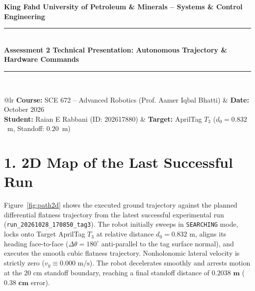 \documentclass[10pt,a4paper]{article}
\begin{document}
\begin{center}
    {\large \textbf{King Fahd University of Petroleum \& Minerals -- Systems \& Control Engineering}}\\[0.02cm]
    \rule{\textwidth}{0.7pt}\\[0.04cm]
    {\Large \textbf{Assessment 2 Technical Presentation: Autonomous Trajectory \& Hardware Commands}}\\[0.04cm]
    \rule{\textwidth}{0.7pt}\\[0.04cm]
    \footnotesize
    \begin{tabular*}{\textwidth}{@{\extracolsep{\fill}}lr}
        \textbf{Course:} SCE 672 -- Advanced Robotics (Prof. Aamer Iqbal Bhatti) & \textbf{Date:} October 2026 \\
        \textbf{Student:} Raian E Rabbani (ID: 202617880) & \textbf{Target:} AprilTag $T_3$ ($d_0 = 0.832$~m, Standoff: $0.20$~m) \\
    \end{tabular*}
\end{center}
\vspace{-0.20cm}

\section*{1. 2D Map of the Last Successful Run}
\vspace{-0.10cm}
Figure~\ref{fig:path2d} shows the executed ground trajectory against the planned differential flatness trajectory from the latest successful experimental run (\texttt{run\_20261028\_170850\_tag3}). The robot initially sweeps in \texttt{SEARCHING} mode, locks onto Target AprilTag $T_3$ at relative distance $d_0 = 0.832\text{~m}$, aligns its heading face-to-face ($\Delta\theta = 180^\circ$ anti-parallel to the tag surface normal), and executes the smooth cubic flatness trajectory. Nonholonomic lateral velocity is strictly zero ($v_y \equiv 0.000\text{~m/s}$). The robot decelerates smoothly and arrests motion at the $20\text{~cm}$ standoff boundary, reaching a final standoff distance of $\mathbf{0.2038\text{~m}}$ ($\mathbf{0.38\text{~cm}}$ error).
\end{document}

